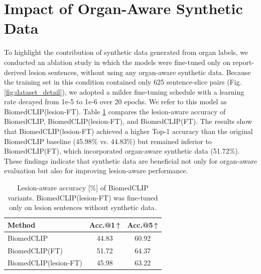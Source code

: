 \documentclass[bioengineering,article,submit,pdftex,moreauthors]{Definitions/mdpi}
\begin{document}
\section{Impact of Organ-Aware Synthetic Data}\label{app:impact}
To highlight the contribution of synthetic data generated from organ labels, we conducted an ablation study in which the models were fine-tuned only on report-derived lesion sentences, without using any organ-aware synthetic data. 
Because the training set in this condition contained only 625 sentence-slice pairs (Fig. \ref{fig:dataset_detail}), we adopted a milder fine-tuning schedule with a learning rate decayed from 1e-5 to 1e-6 over 20 epochs. 
We refer to this model as BiomedCLIP(lesion-FT). 
Table \ref{tab:impact} compares the lesion-aware accuracy of BiomedCLIP, BiomedCLIP(lesion-FT), and BiomedCLIP(FT).
The results show that BiomedCLIP(lesion-FT) achieved a higher Top-1 accuracy than the original BiomedCLIP baseline (45.98\% vs. 44.83\%) but remained inferior to BiomedCLIP(FT), which incorporated organ-aware synthetic data (51.72\%).
These findings indicate that synthetic data are beneficial not only for organ-aware evaluation but also for improving lesion-aware performance.

\begin{table}[ht]
  \centering
  \caption{Lesion-aware accuracy [\%] of BiomedCLIP variants. BiomedCLIP(lesion-FT) was fine-tuned only on lesion sentences without synthetic data.}
  \label{tab:impact}
  \begin{tabular}{lcc}
    \toprule
    Method                  & Acc.@1\,↑      & Acc.@5\,↑      \\
    \midrule
    BiomedCLIP              & 44.83       & 60.92       \\
    BiomedCLIP(FT)          & 51.72       & 64.37       \\
    BiomedCLIP(lesion-FT)   & 45.98       & 63.22       \\
    \bottomrule
  \end{tabular}
\end{table}
\end{document}
